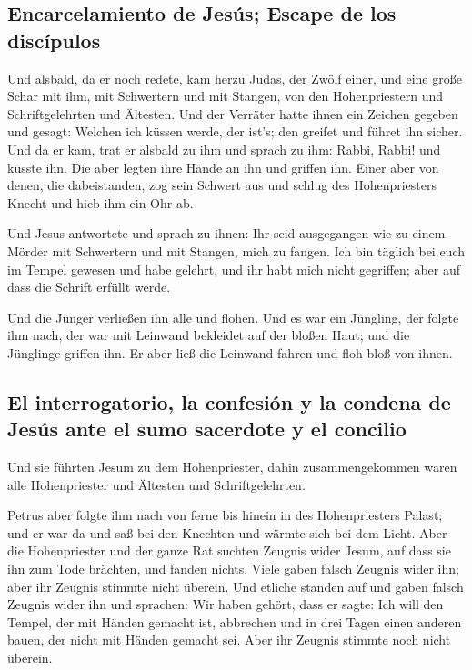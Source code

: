 \hypertarget{encarcelamiento-de-jesuxfas-escape-de-los-discuxedpulos}{%
\subsection{Encarcelamiento de Jesús; Escape de los
discípulos}\label{encarcelamiento-de-jesuxfas-escape-de-los-discuxedpulos}}

 Und alsbald, da er noch redete, kam herzu Judas, der
Zwölf einer, und eine große Schar mit ihm, mit Schwertern und mit
Stangen, von den Hohenpriestern und Schriftgelehrten und Ältesten.
 Und der Verräter hatte ihnen ein Zeichen gegeben und
gesagt: Welchen ich küssen werde, der ist's; den greifet und führet ihn
sicher.  Und da er kam, trat er alsbald zu ihm und sprach
zu ihm: Rabbi, Rabbi! und küsste ihn.  Die aber legten
ihre Hände an ihn und griffen ihn.  Einer aber von denen,
die dabeistanden, zog sein Schwert aus und schlug des Hohenpriesters
Knecht und hieb ihm ein Ohr ab.

 Und Jesus antwortete und sprach zu ihnen: Ihr seid
ausgegangen wie zu einem Mörder mit Schwertern und mit Stangen, mich zu
fangen.  Ich bin täglich bei euch im Tempel gewesen und
habe gelehrt, und ihr habt mich nicht gegriffen; aber auf dass die
Schrift erfüllt werde.

 Und die Jünger verließen ihn alle und flohen.
 Und es war ein Jüngling, der folgte ihm nach, der war
mit Leinwand bekleidet auf der bloßen Haut; und die Jünglinge griffen
ihn.  Er aber ließ die Leinwand fahren und floh bloß von
ihnen.

\hypertarget{el-interrogatorio-la-confesiuxf3n-y-la-condena-de-jesuxfas-ante-el-sumo-sacerdote-y-el-concilio}{%
\subsection{El interrogatorio, la confesión y la condena de Jesús ante
el sumo sacerdote y el
concilio}\label{el-interrogatorio-la-confesiuxf3n-y-la-condena-de-jesuxfas-ante-el-sumo-sacerdote-y-el-concilio}}

 Und sie führten Jesum zu dem Hohenpriester, dahin
zusammengekommen waren alle Hohenpriester und Ältesten und
Schriftgelehrten.

 Petrus aber folgte ihm nach von ferne bis hinein in des
Hohenpriesters Palast; und er war da und saß bei den Knechten und wärmte
sich bei dem Licht.  Aber die Hohenpriester und der ganze
Rat suchten Zeugnis wider Jesum, auf dass sie ihn zum Tode brächten, und
fanden nichts.  Viele gaben falsch Zeugnis wider ihn;
aber ihr Zeugnis stimmte nicht überein.  Und etliche
standen auf und gaben falsch Zeugnis wider ihn und sprachen:
 Wir haben gehört, dass er sagte: Ich will den Tempel,
der mit Händen gemacht ist, abbrechen und in drei Tagen einen anderen
bauen, der nicht mit Händen gemacht sei.  Aber ihr
Zeugnis stimmte noch nicht überein.

